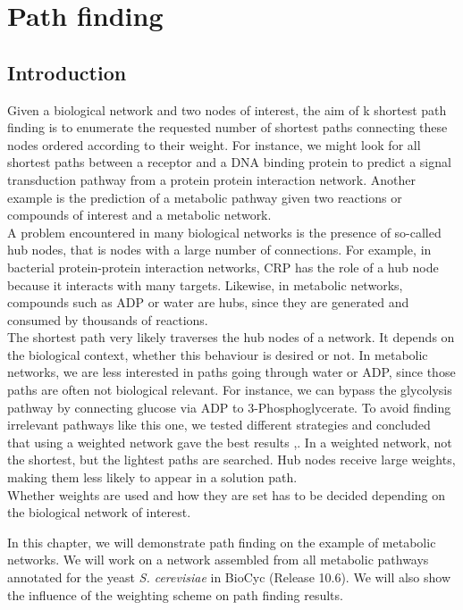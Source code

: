 \chapter{Path finding}

\section{Introduction}
Given a biological network and two nodes of interest, the aim of k shortest path finding is
to enumerate the requested number of shortest paths connecting these nodes ordered according to their weight.
For instance, we might look for all shortest paths between a receptor and a DNA binding protein to predict a signal
transduction pathway from a protein protein interaction network. Another example is the prediction of a metabolic pathway
given two reactions or compounds of interest and a metabolic network.\\
A problem encountered in many biological networks is the presence of so-called hub nodes, that is nodes with
a large number of connections. For example, in bacterial protein-protein interaction networks,
CRP has the role of a hub node because it interacts with many targets. Likewise,
in metabolic networks, compounds such as ADP or water are hubs, since they are generated and consumed by thousands of
reactions.\\
The shortest path very likely traverses the hub nodes of a network. It depends on the biological context, whether this
behaviour is desired or not. In metabolic networks, we are less interested in paths going through water or ADP, since
those paths are often not biological relevant. For instance, we can bypass the glycolysis pathway by connecting glucose
via ADP to 3-Phosphoglycerate. To avoid finding irrelevant pathways like this one,
we tested different strategies and concluded that using a weighted network gave the best results \cite{croes05},\cite{croes06}.
In a weighted network, not the shortest, but the lightest paths are searched. Hub nodes receive large weights, making them
less likely to appear in a solution path.\\
Whether weights are used and how they are set has to be decided depending on the biological network of interest.

In this chapter, we will demonstrate path finding on the example of metabolic networks. We will work on a network assembled
from all metabolic pathways annotated for the yeast \textit{S. cerevisiae} in BioCyc (Release 10.6). We will also show
the influence of the weighting scheme on path finding results.

